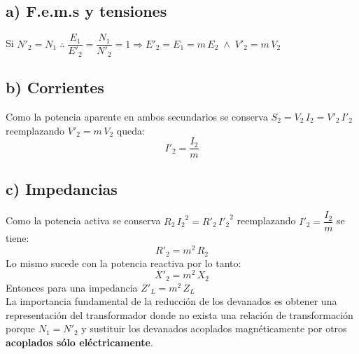 \subsection*{a) F.e.m.s y tensiones}
Si $N'_{2}=N_{1} \; \therefore \; \dfrac{E_{1}}{E'_{2}}=\dfrac{N_{1}}{N'_{2}}=1 \Rightarrow \boxed{E'_{2}=E_{1}=m \, E_{2} \; \wedge \; V'_{2}=m \, V_{2}}$

\subsection*{b) Corrientes}
Como la potencia aparente en ambos secundarios se conserva $S_{2}=V_{2}\, I_{2}=V'_{2}\, I'_{2}$ reemplazando $V'_{2}=m \, V_{2}$ queda:
\begin{equation}
	I'_{2}=\dfrac{I_{2}}{m}
\end{equation}

\subsection*{c) Impedancias}
Como la potencia activa se conserva $R_{2}\, {I_{2}}^{2} = R'_{2} \, {I'_{2}}^{2}$ reemplazando $I'_{2}=\dfrac{I_{2}}{m}$ se tiene:
\begin{equation}
	R'_{2}=m^{2}\, R_{2}
\end{equation}
Lo mismo sucede con la potencia reactiva por lo tanto:
\begin{equation}
	X'_{2}=m^{2}\, X_{2}
\end{equation}
Entonces para una impedancia $Z'_{L}=m^{2}\, Z_{L}$\\

La importancia fundamental de la reducción de los devanados es obtener una representación del transformador donde no exista una relación de transformación porque $N_{1}=N'_{2}$ y sustituir los devanados acoplados magnéticamente por otros \textbf{acoplados sólo eléctricamente}.
